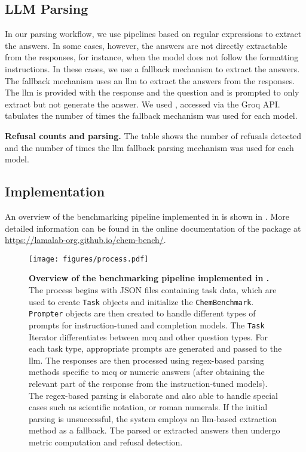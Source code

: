 \subsection{LLM Parsing} \label{sec:llm-parsing}

In our parsing workflow, we use pipelines based on regular expressions to extract the answers. In some cases, however, the answers are not directly extractable from the responses, for instance, when the model does not follow the formatting instructions. In these cases, we use a fallback mechanism to extract the answers. The fallback mechanism uses an \gls{llm} to extract the answers from the responses. The \gls{llm} is provided with the response and the question and is prompted to only extract but not generate the answer. We used \LlamaThreeSeventyBInstruct, accessed via the Groq API.
 tabulates the number of times the fallback mechanism was used for each model.


\begin{table}
    \centering
    \caption{\textbf{Refusal counts and parsing.} The table shows the number of refusals detected and the number of times the \gls{llm} fallback parsing mechanism was used for each model.}
    \label{tab:refusal_counts_and_parsing}
\end{table}

\clearpage
\subsection{Implementation}
An overview of the benchmarking pipeline implemented in \chembench is shown in . More detailed information can be found in the online documentation of the \chembench package at \url{https://lamalab-org.github.io/chem-bench/}.
\begin{figure}
    \centering
    \texttt{[image: figures/process.pdf]}
    \caption{\textbf{Overview of the benchmarking pipeline implemented in \chembench.} The process begins with JSON files containing task data, which are used to create \texttt{Task} objects and initialize the \texttt{ChemBenchmark}. \texttt{Prompter} objects are then created to handle different types of prompts for instruction-tuned and completion models.
    The \texttt{Task} Iterator differentiates between \gls{mcq} and other question types. For each task type, appropriate prompts are generated and passed to the \gls{llm}. The responses are then processed using regex-based parsing methods specific to \gls{mcq} or numeric answers (after obtaining the relevant part of the response from the instruction-tuned models).
    The regex-based parsing is elaborate and also able to handle special cases such as scientific notation, or roman numerals.
    If the initial parsing is unsuccessful, the system employs an \gls{llm}-based extraction method as a fallback. The parsed or extracted answers then undergo metric computation and refusal detection.}
    \label{fig:process}
\end{figure}



